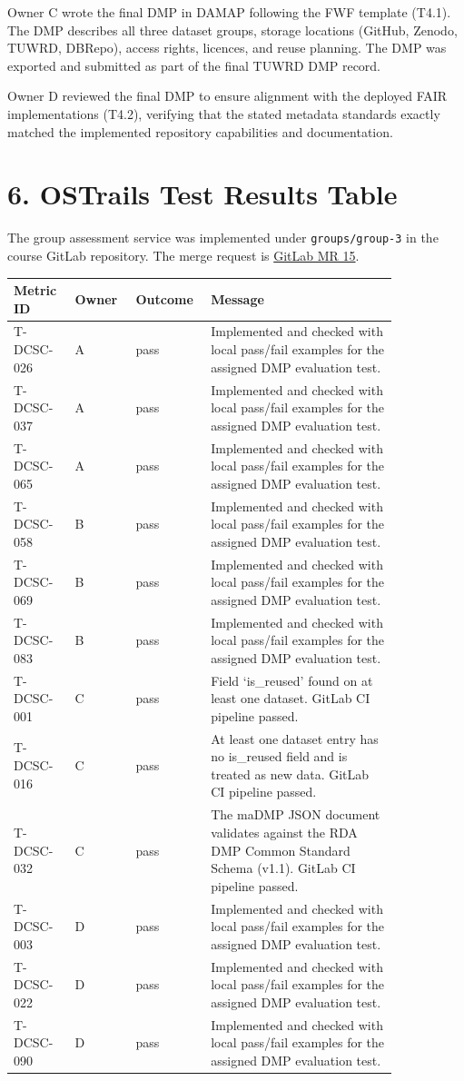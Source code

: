 \documentclass[10pt,a4paper]{article}
\begin{document}
Owner C wrote the final DMP in DAMAP following the FWF template (T4.1). The DMP
describes all three dataset groups, storage locations (GitHub, Zenodo, TUWRD,
DBRepo), access rights, licences, and reuse planning. The DMP was exported and
submitted as part of the final TUWRD DMP record.

Owner D reviewed the final DMP to ensure alignment with the deployed FAIR
implementations (T4.2), verifying that the stated metadata standards exactly
matched the implemented repository capabilities and documentation.

\section*{6. OSTrails Test Results Table}
The group assessment service was implemented under
\texttt{groups/group-3} in the course GitLab repository. The merge request is
\href{https://gitlab.tuwien.ac.at/crdm/data-stewardship/dast-2026-ue/-/merge_requests/15}{GitLab MR 15}.

\noindent\begin{tabular}{p{0.14\linewidth}p{0.14\linewidth}p{0.12\linewidth}p{0.44\linewidth}}
\toprule
Metric ID & Owner & Outcome & Message \\
\midrule
T-DCSC-026 & A & pass & Implemented and checked with local pass/fail examples for the assigned DMP evaluation test. \\
T-DCSC-037 & A & pass & Implemented and checked with local pass/fail examples for the assigned DMP evaluation test. \\
T-DCSC-065 & A & pass & Implemented and checked with local pass/fail examples for the assigned DMP evaluation test. \\
T-DCSC-058 & B & pass & Implemented and checked with local pass/fail examples for the assigned DMP evaluation test. \\
T-DCSC-069 & B & pass & Implemented and checked with local pass/fail examples for the assigned DMP evaluation test. \\
T-DCSC-083 & B & pass & Implemented and checked with local pass/fail examples for the assigned DMP evaluation test. \\
T-DCSC-001 & C & pass & Field `is\_reused' found on at least one dataset. GitLab CI pipeline passed. \\
T-DCSC-016 & C & pass & At least one dataset entry has no is\_reused field and is treated as new data. GitLab CI pipeline passed. \\
T-DCSC-032 & C & pass & The maDMP JSON document validates against the RDA DMP Common Standard Schema (v1.1). GitLab CI pipeline passed. \\
T-DCSC-003 & D & pass & Implemented and checked with local pass/fail examples for the assigned DMP evaluation test. \\
T-DCSC-022 & D & pass & Implemented and checked with local pass/fail examples for the assigned DMP evaluation test. \\
T-DCSC-090 & D & pass & Implemented and checked with local pass/fail examples for the assigned DMP evaluation test. \\
\bottomrule
\end{tabular}
\end{document}
